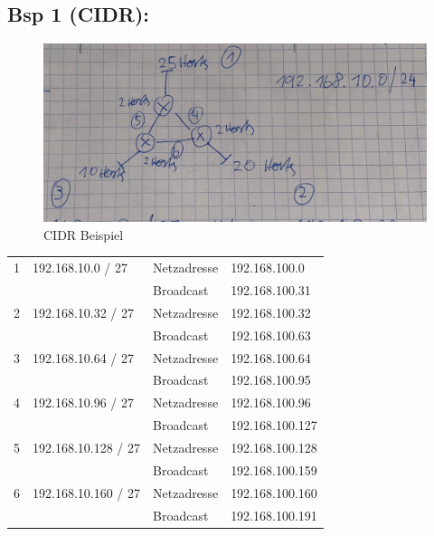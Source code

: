 \subsection*{Bsp 1 (CIDR):}
\begin{figure}[H]
	\centering
	\includegraphics[width=1.0\linewidth]{figures/bsp1_cidr.jpeg}
	\caption{CIDR Beispiel}
\end{figure}
\begin{table}[H]
	\begin{tabular}{llll}
		1 & 192.168.10.0 / 27 & Netzadresse & 192.168.100.0 \\
		&  & Broadcast & 192.168.100.31 \\
		\hline
		2 & 192.168.10.32 / 27 & Netzadresse & 192.168.100.32 \\
		&  & Broadcast & 192.168.100.63 \\
		\hline
		3 & 192.168.10.64 / 27 & Netzadresse & 192.168.100.64 \\
		&  & Broadcast & 192.168.100.95 \\
		\hline
		4 & 192.168.10.96 / 27 & Netzadresse & 192.168.100.96 \\
		&  & Broadcast & 192.168.100.127 \\
		\hline
		5 & 192.168.10.128 / 27 & Netzadresse & 192.168.100.128 \\
		&  & Broadcast & 192.168.100.159 \\
		\hline
		6 & 192.168.10.160 / 27 & Netzadresse & 192.168.100.160 \\
		&  & Broadcast & 192.168.100.191
	\end{tabular}
\end{table}

